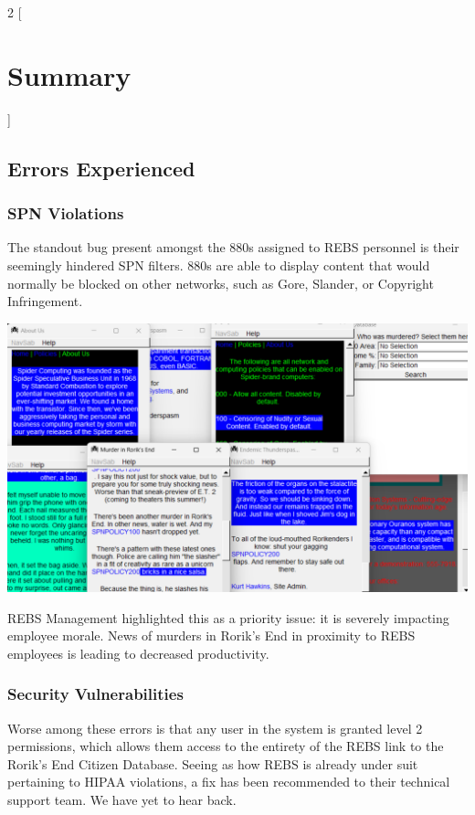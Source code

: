 \documentclass{article}
\begin{document}
\begin{multicols}{2}
[
\section{Summary}
]
\subsection{Errors Experienced}
\subsubsection{SPN Violations}
The standout bug present amongst the 880s assigned to REBS personnel is their seemingly hindered SPN filters. 880s are able to display content that would normally be blocked on other networks, such as Gore, Slander, or Copyright Infringement.

\begin{center}
\includegraphics[scale=0.25]{spnpolicy.png}
\end{center}

REBS Management highlighted this as a priority issue: it is severely impacting employee morale. News of murders in Rorik's End in proximity to REBS employees is leading to decreased productivity.

\subsubsection{Security Vulnerabilities}
Worse among these errors is that any user in the system is granted level 2 permissions, which allows them access to the entirety of the REBS link to the Rorik's End Citizen Database. Seeing as how REBS is already under suit pertaining to HIPAA violations, a fix has been recommended to their technical support team. We have yet to hear back.


\end{multicols}
\end{document}
